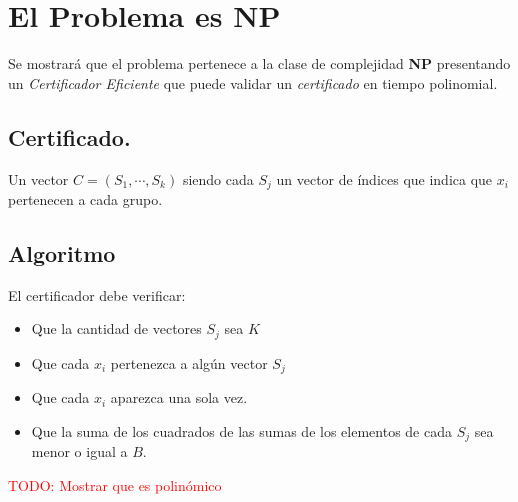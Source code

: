 \section{El Problema es NP}
Se mostrará que el problema pertenece a la clase de complejidad \textbf{NP}
presentando un \textit{Certificador Eficiente} que puede validar un
\textit{certificado} en tiempo polinomial.

\subsection*{Certificado.}
Un vector $C=(S_{1},\cdots,S_{k})$ siendo cada $S_{j}$ un vector de índices
que indica que $x_{i}$ pertenecen a cada grupo.

\subsection*{Algoritmo}
El certificador debe verificar:
\begin{itemize}
    \item Que la cantidad de vectores $S_{j}$ sea $K$
    \item Que cada $x_{i}$ pertenezca a algún vector $S_{j}$
    \item Que cada $x_{i}$ aparezca una sola vez.
    \item Que la suma de los cuadrados de las sumas de los elementos de cada
    $S_{j}$ sea menor o igual a $B$.
\end{itemize}

\textcolor{red}{TODO: Mostrar que es polinómico}